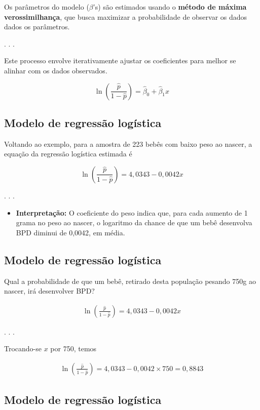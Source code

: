 \documentclass[
  letterpaper,
  DIV=11,
  numbers=noendperiod]{scrartcl}
\providecommand{\tightlist}{%
  \setlength{\itemsep}{0pt}\setlength{\parskip}{0pt}}\usepackage{longtable,booktabs,array}
\begin{document}
Os parâmetros do modelo (\(\beta\)'s) são estimados usando o
\textbf{método de máxima verossimilhança}, que busca maximizar a
probabilidade de observar os dados dados os parâmetros.

. . .

Este processo envolve iterativamente ajustar os coeficientes para melhor
se alinhar com os dados observados.

\[\ln\left ( \frac{\hat{p}}{1-\hat{p}} \right) = \hat{\beta}_0 + \hat{\beta}_1 x\]

\subsection{Modelo de regressão
logística}\label{modelo-de-regressuxe3o-loguxedstica-2}

Voltando ao exemplo, para a amostra de 223 bebês com baixo peso ao
nascer, a equação da regressão logística estimada é

\[\ln\left ( \frac{\hat{p}}{1-\hat{p}} \right) = 4,0343 - 0,0042 x\]

. . .

\begin{itemize}
\tightlist
\item
  \textbf{Interpretação:} O coeficiente do peso indica que, para cada
  aumento de 1 grama no peso ao nascer, o logaritmo da chance de que um
  bebê desenvolva BPD diminui de 0,0042, em média.
\end{itemize}

\subsection{Modelo de regressão
logística}\label{modelo-de-regressuxe3o-loguxedstica-3}

Qual a probabilidade de que um bebê, retirado desta população pesando
750g ao nascer, irá desenvolver BPD?

\[
\begin{eqnarray*}
\ln\left ( \frac{\hat{p}}{1-\hat{p}} \right) = 4,0343 - 0,0042 x
\end{eqnarray*}
\]

. . .

Trocando-se \(x\) por 750, temos

\[
\begin{eqnarray*}
\ln\left ( \frac{\hat{p}}{1-\hat{p}} \right) = 4,0343 - 0,0042 \times 750 = 0,8843
\end{eqnarray*}
\]

\subsection{Modelo de regressão
logística}\label{modelo-de-regressuxe3o-loguxedstica-4}
\end{document}

